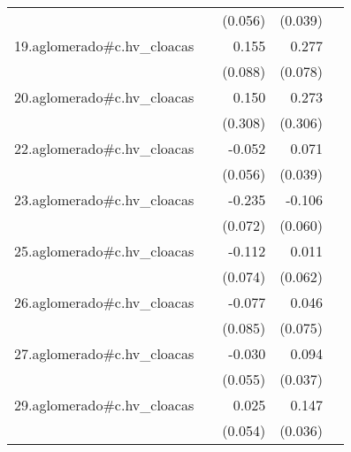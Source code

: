 {\begin{longtable}{l*{4}{D{.}{.}{-1}}}
            &                     &     (0.056)         &     (0.039)         &                     \\
\addlinespace
19.aglomerado#c.hv\_cloacas&                     &       0.155         &       0.277\sym{***}&                     \\
            &                     &     (0.088)         &     (0.078)         &                     \\
\addlinespace
20.aglomerado#c.hv\_cloacas&                     &       0.150         &       0.273         &                     \\
            &                     &     (0.308)         &     (0.306)         &                     \\
\addlinespace
22.aglomerado#c.hv\_cloacas&                     &      -0.052         &       0.071         &                     \\
            &                     &     (0.056)         &     (0.039)         &                     \\
\addlinespace
23.aglomerado#c.hv\_cloacas&                     &      -0.235\sym{**} &      -0.106         &                     \\
            &                     &     (0.072)         &     (0.060)         &                     \\
\addlinespace
25.aglomerado#c.hv\_cloacas&                     &      -0.112         &       0.011         &                     \\
            &                     &     (0.074)         &     (0.062)         &                     \\
\addlinespace
26.aglomerado#c.hv\_cloacas&                     &      -0.077         &       0.046         &                     \\
            &                     &     (0.085)         &     (0.075)         &                     \\
\addlinespace
27.aglomerado#c.hv\_cloacas&                     &      -0.030         &       0.094\sym{*}  &                     \\
            &                     &     (0.055)         &     (0.037)         &                     \\
\addlinespace
29.aglomerado#c.hv\_cloacas&                     &       0.025         &       0.147\sym{***}&                     \\
            &                     &     (0.054)         &     (0.036)         &                     \\

\end{longtable}}
